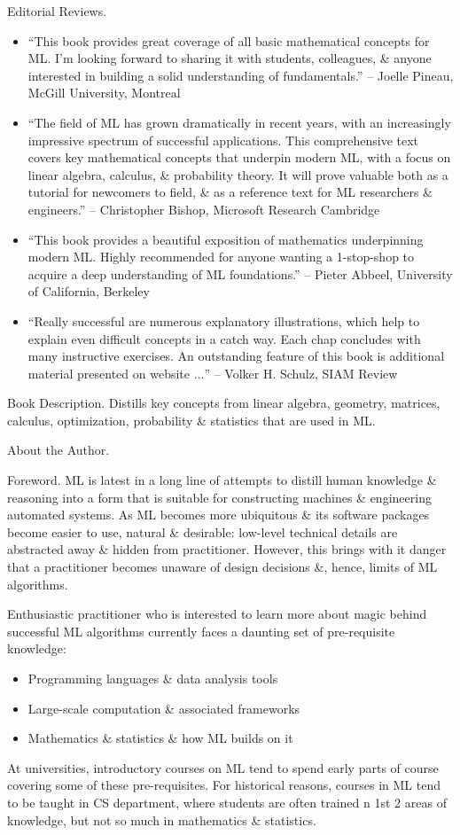 \documentclass{article}
\begin{document}
{\sf Editorial Reviews.}
\begin{itemize}
	\item ``This book provides great coverage of all basic mathematical concepts for ML. I'm looking forward to sharing it with students, colleagues, \& anyone interested in building a solid understanding of fundamentals.'' -- {\sc Joelle Pineau}, McGill University, Montreal
	\item ``The field of ML has grown dramatically in recent years, with an increasingly impressive spectrum of successful applications. This comprehensive text covers key mathematical concepts that underpin modern ML, with a focus on linear algebra, calculus, \& probability theory. It will prove valuable both as a tutorial for newcomers to field, \& as a reference text for ML researchers \& engineers.'' -- {\sc Christopher Bishop}, Microsoft Research Cambridge
	\item ``This book provides a beautiful exposition of mathematics underpinning modern ML. Highly recommended for anyone wanting a 1-stop-shop to acquire a deep understanding of ML foundations.'' -- {\sc Pieter Abbeel}, University of California, Berkeley
	\item ``Really successful are numerous explanatory illustrations, which help to explain even difficult concepts in a catch way. Each chap concludes with many instructive exercises. An outstanding feature of this book is additional material presented on website $\ldots$'' -- {\sc Volker H. Schulz}, SIAM Review
\end{itemize}
{\sf Book Description.} Distills key concepts from linear algebra, geometry, matrices, calculus, optimization, probability \& statistics that are used in ML.

{\sf About the Author.}

{\sf Foreword.} ML is latest in a long line of attempts to distill human knowledge \& reasoning into a form that is suitable for constructing machines \& engineering automated systems. As ML becomes more ubiquitous \& its software packages become easier to use, natural \& desirable: low-level technical details are abstracted away \& hidden from practitioner. However, this brings with it danger that a practitioner becomes unaware of design decisions \&, hence, limits of ML algorithms.

Enthusiastic practitioner who is interested to learn more about magic behind successful ML algorithms currently faces a daunting set of pre-requisite knowledge:
\begin{itemize}
	\item Programming languages \& data analysis tools
	\item Large-scale computation \& associated frameworks
	\item Mathematics \& statistics \& how ML builds on it
\end{itemize}
At universities, introductory courses on ML tend to spend early parts of course covering some of these pre-requisites. For historical reasons, courses in ML tend to be taught in CS department, where students are often trained n 1st 2 areas of knowledge, but not so much in mathematics \& statistics.
\end{document}
